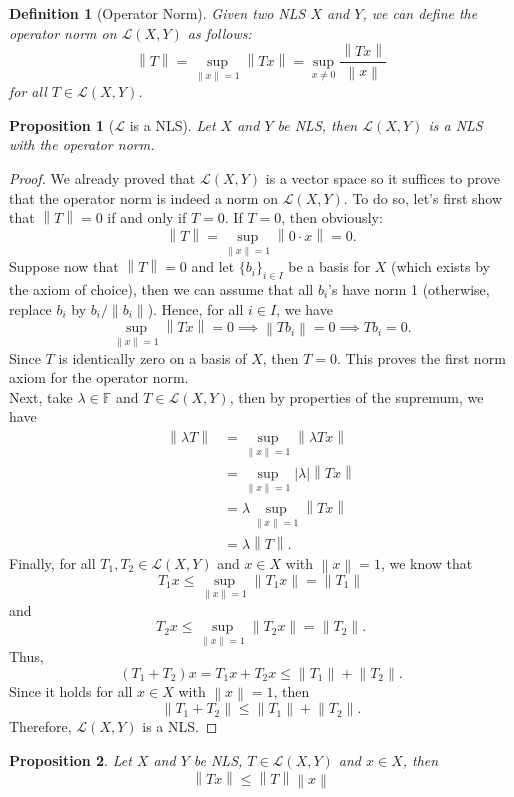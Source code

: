\documentclass{article}
\newtheorem*{proposition}{Proposition}
\newtheorem*{definition}{Definition}
\newcommand{\F}{\mathbb{F}}
\renewcommand{\L}{\mathcal{L}}
\newcommand{\norm}[1]{\left\lVert#1 \right\rVert}
\begin{document}
\begin{definition}[Operator Norm]
    Given two NLS $X$ and $Y$, we can define the operator norm on $\L(X,Y)$ as follows:
    $$\norm{T} = \sup_{\norm{x} = 1}\norm{Tx} = \sup_{x \neq 0}\frac{\norm{Tx}}{\norm{x}}$$
    for all $T \in \L(X,Y)$.
\end{definition}

\begin{proposition}[$\L$ is a NLS]
    Let $X$ and $Y$ be NLS, then $\L(X,Y)$ is a NLS with the operator norm.
\end{proposition}

\begin{proof}
    We already proved that $\L(X,Y)$ is a vector space so it suffices to prove that the operator norm is indeed a norm on $\L(X,Y)$. To do so, let's first show that $\norm{T} = 0$ if and only if $T = 0$. If $T = 0$, then obviously:
    $$\norm{T} = \sup_{\norm{x} = 1}\norm{0 \cdot x} = 0.$$
    Suppose now that $\norm{T} = 0$ and let $\{b_i\}_{i \in I}$ be a basis for $X$ (which exists by the axiom of choice), then we can assume that all $b_i$'s have norm 1 (otherwise, replace $b_i$ by $b_i / \norm{b_i}$). Hence, for all $i \in I$, we have
    $$\sup_{\norm{x} = 1}\norm{Tx} = 0 \implies \norm{T b_i} = 0 \implies Tb_i = 0.$$
    Since $T$ is identically zero on a basis of $X$, then $T = 0$. This proves the first norm axiom for the operator norm. \\
    Next, take $\lambda \in \F$ and $T \in \L(X,Y)$, then by properties of the supremum, we have
    \begin{align*}
        \norm{\lambda T} &= \sup_{\norm{x} = 1}\norm{\lambda T x} \\
        &= \sup_{\norm{x} = 1}|\lambda|\norm{T x} \\
        &= \lambda \sup_{\norm{x} = 1}\norm{T x} \\
        &= \lambda \norm{T}.
    \end{align*}
    Finally, for all $T_1, T_2 \in \L(X,Y)$ and $x \in X$ with $\norm{x} = 1$, we know that
    $$T_1 x \leq \sup_{\norm{x} = 1}\norm{T_1 x} = \norm{T_1}$$
    and 
    $$T_2 x \leq \sup_{\norm{x} = 1}\norm{T_2 x} = \norm{T_2}.$$
    Thus,
    $$(T_1 + T_2)x = T_1x + T_2x \leq \norm{T_1} + \norm{T_2}.$$
    Since it holds for all $x \in X$ with $\norm{x} = 1$, then
    $$\norm{T_1 + T_2} \leq \norm{T_1} + \norm{T_2}.$$
    Therefore, $\L(X,Y)$ is a NLS. 
\end{proof}

\begin{proposition}
    Let $X$ and $Y$ be NLS, $T \in \L(X,Y)$ and $x \in X$, then
    $$\norm{Tx} \leq \norm{T}\norm{x}$$
\end{proposition}
\end{document}
